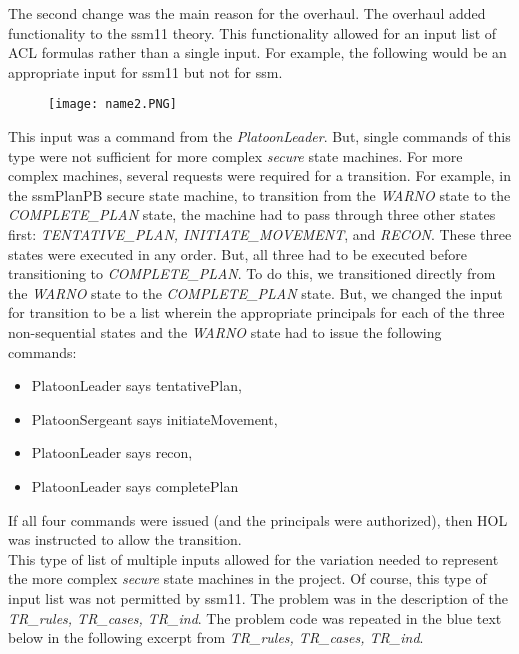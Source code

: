  The second change was the main reason for the overhaul.  The overhaul added functionality to the ssm11 theory.  This functionality allowed for an input list of ACL formulas rather than a single input.  For example, the following would be an appropriate input for ssm11 but not for ssm.\\
  
  \begin{figure}[h]
  \centering
  \texttt{[image: name2.PNG]}
\end{figure}

This input was a command from the \emph{PlatoonLeader}.  But, single commands of this type were not sufficient for more complex \emph{secure} state machines.  For more complex machines, several requests were required for a transition.  For example, in the ssmPlanPB secure state machine, to transition from the \emph{WARNO} state to the \emph{COMPLETE_PLAN} state, the machine had to pass through three other states first: \emph{TENTATIVE_PLAN, INITIATE_MOVEMENT}, and \emph{RECON}.  These three states were executed in any order.  But, all three had to be executed before transitioning to \emph{COMPLETE_PLAN}.  To do this, we transitioned directly from the \emph{WARNO} state to the \emph{COMPLETE_PLAN} state.  But, we changed the input for transition to be a list wherein the appropriate principals for each of the three non-sequential states and the \emph{WARNO} state had to issue the following commands:
  \begin{itemize}
  \item PlatoonLeader says tentativePlan,
   \item  PlatoonSergeant says initiateMovement, 
   \item PlatoonLeader says recon, 
   \item PlatoonLeader says completePlan
   \end{itemize}
   If all four commands were issued (and the principals were authorized), then HOL was instructed to allow the transition. \\
   
This type of list of multiple inputs allowed for the variation needed to represent the more complex \emph{secure} state machines in the project.  Of course, this type of input list was not permitted by ssm11.  The problem was in the description of the \emph{TR_rules, TR_cases, TR_ind}. The problem code was repeated in the blue text below in the following excerpt from \emph{TR_rules, TR_cases, TR_ind}.\\
     
